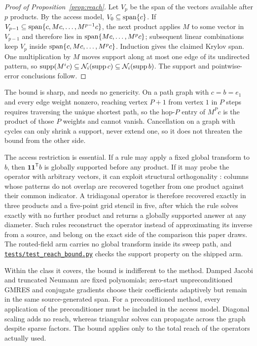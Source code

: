 \begin{proof}[Proof of Proposition~\ref{prop:reach}]
Let $V_p$ be the span of the vectors available after $p$ products. By the
access model, $V_0\subseteq\operatorname{span}\{c\}$. If
$V_{p-1}\subseteq\operatorname{span}\{c,Mc,\dots,M^{p-1}c\}$, the next product applies $M$ to
some vector in $V_{p-1}$ and therefore lies in
$\operatorname{span}\{Mc,\dots,M^pc\}$; subsequent linear combinations keep $V_p$ inside
$\operatorname{span}\{c,Mc,\dots,M^pc\}$. Induction gives the claimed Krylov span. One
multiplication by $M$ moves support along at most one edge of its undirected
pattern, so $\operatorname{supp}(M^ic)\subseteq\mathcal{N}_i(\operatorname{supp} c)\subseteq\mathcal{N}_i(\operatorname{supp} b)$.
The support and pointwise-error conclusions follow.
\end{proof}

The bound is sharp, and needs no genericity. On a path graph with $c=b=e_1$ and
every edge weight nonzero, reaching vertex $P+1$ from vertex $1$ in $P$ steps
requires traversing the unique shortest path, so the hop-$P$ entry of $M^{P}c$
is the product of those $P$ weights and cannot vanish. Cancellation on a graph
with cycles can only shrink a support, never extend one, so it does not
threaten the bound from the other side.

The access restriction is essential. If a rule may apply a fixed global transform
to $b$, then $\mathbf{1}\mathbf{1}^{\mathsf T}b$ is globally supported before
any product. If it may probe the operator with arbitrary vectors, it can exploit
structural orthogonality \citep{curtis1974estimation}: columns whose patterns
do not overlap are recovered together from one product against their common
indicator. A tridiagonal operator is therefore recovered exactly in three
products and a five-point grid stencil in five, after which the rule solves
exactly with no further product and returns a globally supported answer at any
diameter. Such
rules reconstruct the operator instead of approximating its inverse from a
source, and belong on the exact side of the comparison this paper draws.
The routed-field arm carries no global transform inside its sweep path, and
\href{https://github.com/vanshsehrawat14/gabp-sparse-inv/blob/main/tests/test_reach_bound.py}
{\nolinkurl{tests/test_reach_bound.py}} checks the support property on the shipped arm.

Within the class it covers, the bound is indifferent to the method. Damped
Jacobi and truncated Neumann are fixed polynomials; zero-start
unpreconditioned GMRES and conjugate gradients choose their coefficients
adaptively but remain in the same source-generated span. For a preconditioned
method, every application of the preconditioner must be included in the access
model. Diagonal scaling adds no reach, whereas triangular solves can propagate
across the graph despite sparse factors. The bound applies only to the total
reach of the operators actually used.

